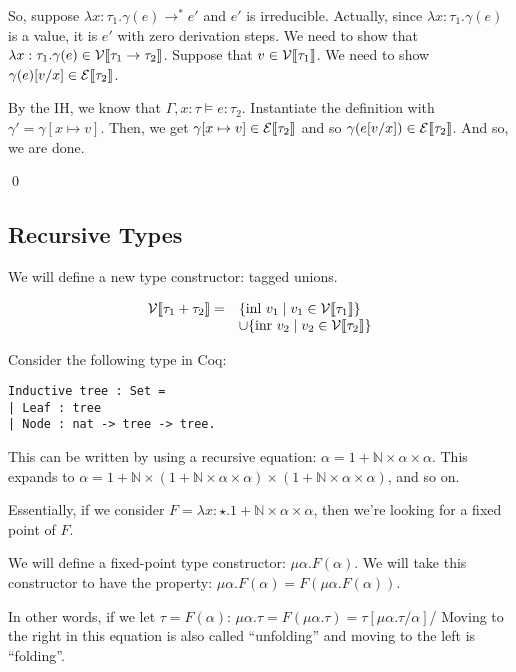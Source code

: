 So, suppose $\lambda x: \tau_1. \gamma(e) \to^* e'$ and $e'$ is irreducible. Actually, since $\lambda x: \tau_1. \gamma(e)$ is
a value, it is $e'$ with zero derivation steps. 
We need to show that $\lambda x: \tau_1. \gamma(e) \in \mathcal{V}\llbracket \tau_1 \to \tau_2 \rrbracket$.
Suppose that $v\in \mathcal{V}\llbracket \tau_1 \rrbracket$. We need to show $\gamma(e)[v/x] \in \mathcal{E} \llbracket \tau_2 \rrbracket$.

By the IH, we know that $\Gamma, x : \tau \models e : \tau_2$. Instantiate the definition with $\gamma' = \gamma[x\mapsto v]$.
Then, we get $\gamma[x\mapsto v]\in\mathcal{E} \llbracket \tau_2 \rrbracket$ and so $\gamma(e[v/x]) \in \mathcal{E} \llbracket \tau_2 \rrbracket$.
And so, we are done.

\qed

\subsection{Recursive Types}

We will define a new type constructor: tagged unions.

\[
\begin{array}{rl}
\mathcal{V}\llbracket \tau_1 + \tau_2 \rrbracket = & \{\text{inl~} v_1 \mid v_1 \in \mathcal{V} \llbracket \tau_1 \rrbracket\} \\
& \cup \{\text{inr~} v_2 \mid v_2 \in \mathcal{V} \llbracket \tau_2 \rrbracket\}

\end{array}
\]


Consider the following type in Coq:
\begin{lstlisting}
Inductive tree : Set =
| Leaf : tree
| Node : nat -> tree -> tree.
\end{lstlisting}

This can be written by using a recursive equation: $\alpha = 1 + \mathbb{N}\times \alpha\times \alpha$.
This expands to $\alpha = 1 + \mathbb{N}\times (1 + \mathbb{N}\times \alpha\times \alpha)\times (1 + \mathbb{N}\times \alpha\times \alpha)$,
and so on.

Essentially, if we consider $F = \lambda x: \star. 1 + \mathbb{N}\times \alpha\times \alpha$, then we're looking for
a fixed point of $F$.

We will define a fixed-point type constructor: $\mu \alpha. F(\alpha)$. We will take this constructor to have
the property: $\mu \alpha. F(\alpha) = F(\mu \alpha. F(\alpha))$.

In other words, if we let $\tau = F(\alpha)$: $\mu \alpha. \tau = F(\mu \alpha. \tau) = \tau[\mu \alpha. \tau / \alpha]$/
Moving to the right in this equation is also called ``unfolding'' and moving to the left is ``folding''.

